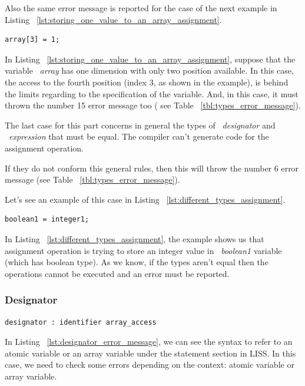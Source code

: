 \documentclass[
  oneside,
  11pt, a4paper,
  footinclude=true,
  headinclude=true,
  cleardoublepage=empty
]{scrbook}
\begin{document}
Also the same error message is reported for the case of the next example in Listing ~\ref{lst:storing_one_value_to_an_array_assignment}.

\begin{lstlisting}[caption={Example of storing a value to a certain position in the array},label={lst:storing_one_value_to_an_array_assignment}]
  array[3] = 1;
\end{lstlisting}

In Listing ~\ref{lst:storing_one_value_to_an_array_assignment}, suppose that the variable ~\textit{array} has one dimension with only two position available. In this case, the access to the fourth position (index 3, as shown in the example), is behind the limits regarding to the specification of the variable.
And, in this case, it must thrown the number 15 error message too ( see Table ~\ref{tbl:types_error_message}).

The last case for this part concerns in general the types of ~\textit{designator} and ~\textit{expression} that must be equal. The compiler can't generate code for the assignment operation.

If they do not conform this general rules, then this will throw the number 6 error message (see Table ~\ref{tbl:types_error_message}).

Let's see an example of this case in Listing ~\ref{lst:different_types_assignment}.

\begin{lstlisting}[caption={Example of assignment with differents types},label={lst:different_types_assignment}]
  boolean1 = integer1;
\end{lstlisting}

In Listing ~\ref{lst:different_types_assignment}, the example shows us that assignment operation is trying to store an integer value in ~\textit{boolean1} variable (which has boolean type).
As we know, if the types aren't equal then the operations cannot be executed and an error must be reported.

\subsubsection{Designator}

\begin{lstlisting}[caption={Designator rule in LISS},label={lst:designator_error_message}]
  designator : identifier array_access
\end{lstlisting}

In Listing ~\ref{lst:designator_error_message}, we can see the syntax to refer to an atomic variable or an array variable under the statement section in LISS.
In this case, we need to check some errors depending on the context: atomic variable or array variable.
\end{document}
